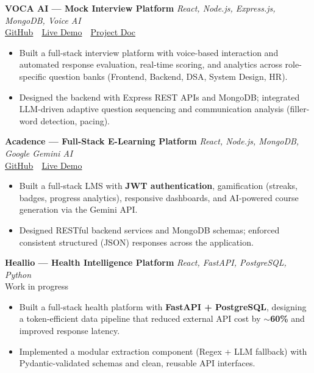 \documentclass[a4paper,10.5pt]{article}
\newcommand{\resumeItem}[1]{\item\small #1}
\begin{document}
\vspace{4pt}

\noindent\textbf{\color{accent}VOCA AI --- Mock Interview Platform}
\hfill \emph{React, Node.js, Express.js, MongoDB, Voice AI}\\
{\small
  \href{https://github.com/Ishita-coder27/ai-interviewer}{GitHub}
  \,\textbar\,
  \href{https://mockinterviewerai.netlify.app/}{Live Demo}
  \,\textbar\,
  \href{https://drive.google.com/file/d/1p491yWfbeOLaWvnOIkI6u5gXdy28YbZl/view?usp=sharing}{Project Doc}
}
\begin{itemize}
  \resumeItem{Built a full-stack interview platform with voice-based interaction and automated response evaluation, real-time scoring, and analytics across role-specific question banks (Frontend, Backend, DSA, System Design, HR).}
  \resumeItem{Designed the backend with Express REST APIs and MongoDB; integrated LLM-driven adaptive question sequencing and communication analysis (filler-word detection, pacing).}
\end{itemize}

\vspace{4pt}

\noindent\textbf{\color{accent}Acadence --- Full-Stack E-Learning Platform}
\hfill \emph{React, Node.js, MongoDB, Google Gemini AI}\\
{\small
  \href{https://github.com/Ishita-coder27/acadence2.0}{GitHub}
  \,\textbar\,
  \href{https://acadence-dashboard-9b46.vercel.app}{Live Demo}
}
\begin{itemize}
  \resumeItem{Built a full-stack LMS with \textbf{JWT authentication}, gamification (streaks, badges, progress analytics), responsive dashboards, and AI-powered course generation via the Gemini API.}
  \resumeItem{Designed RESTful backend services and MongoDB schemas; enforced consistent structured (JSON) responses across the application.}
\end{itemize}

\vspace{4pt}

\noindent\textbf{\color{accent}Heallio --- Health Intelligence Platform}
\hfill \emph{React, FastAPI, PostgreSQL, Python}\\
{\small{Work in progress}}
\begin{itemize}
  \resumeItem{Built a full-stack health platform with \textbf{FastAPI + PostgreSQL}, designing a token-efficient data pipeline that reduced external API cost by $\sim$\textbf{60\%} and improved response latency.}
  \resumeItem{Implemented a modular extraction component (Regex + LLM fallback) with Pydantic-validated schemas and clean, reusable API interfaces.}
\end{itemize}
\end{document}
